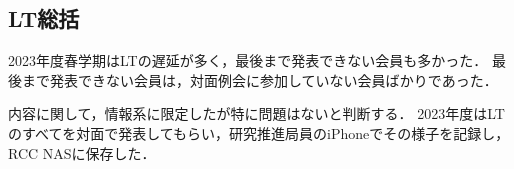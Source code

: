 \subsection*{LT総括}


2023年度春学期はLTの遅延が多く，最後まで発表できない会員も多かった．
最後まで発表できない会員は，対面例会に参加していない会員ばかりであった．

内容に関して，情報系に限定したが特に問題はないと判断する．
2023年度はLTのすべてを対面で発表してもらい，研究推進局員のiPhoneでその様子を記録し，RCC NASに保存した．

